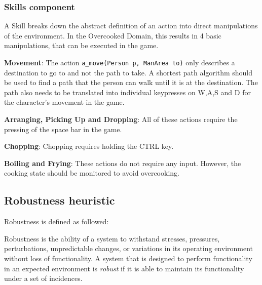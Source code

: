 \subsubsection{Skills component}

A Skill breaks down the abstract definition of an action into direct manipulations of the environment.
In the Overcooked Domain, this results in 4 basic manipulations, that can be executed in the game.

\textbf{Movement}: The action \verb|a_move(Person p, ManArea to)| only describes a destination to go to and not the path to take. 
A shortest path algorithm should be used to find a path that the person can walk until it is at the destination. 
The path also needs to be translated into individual keypresses on W,A,S and D for the character's movement in the game.

\textbf{Arranging, Picking Up and Dropping}: All of these actions require the pressing of the space bar in the game.

\textbf{Chopping}: Chopping requires holding the CTRL key.

\textbf{Boiling and Frying}: These actions do not require any input. 
However, the cooking state should be monitored to avoid overcooking.





\subsection{Robustness heuristic}

Robustness is defined as followed:

\begin{definition}
    Robustness is the ability of a system to withstand stresses, pressures, perturbations, unpredictable changes, or variations in its operating environment without loss of functionality.
    A system that is designed to perform functionality in an expected environment is \emph{robust} if it is able to maintain its functionality under a set of incidences. \citep{barberRobustnessStabilityRecoverability2015}
\end{definition}

